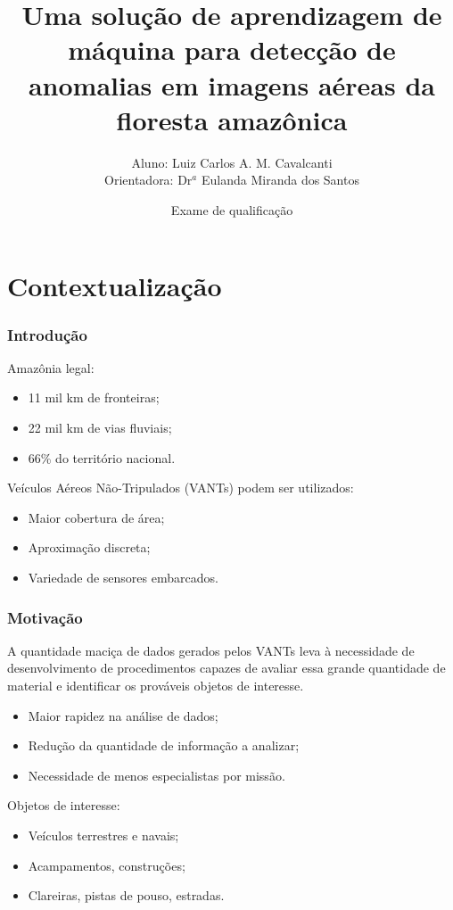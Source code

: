\documentclass[t]{beamer}
\title %
{Uma solução de aprendizagem de máquina para detecção de anomalias em imagens aéreas da floresta amazônica}
\author %
{Aluno: Luiz Carlos A. M. Cavalcanti
\\Orientadora: Dr$^a$ Eulanda Miranda dos Santos} %
\date[] %
{Exame de qualificação}
\begin{document}
  \begin{frame}\titlepage\end{frame}


\section{Contextualização}

\begin{frame}
\frametitle{Introdução}

	Amazônia legal:
	\begin{itemize}
		\item 11 mil km de fronteiras;
		\item 22 mil km de vias fluviais;
		\item 66\% do território nacional.
	\end{itemize}

	\vspace{0.5cm}

	Veículos Aéreos Não-Tripulados (VANTs) podem ser utilizados:
	\begin{itemize}
		\item Maior cobertura de área;
		\item Aproximação discreta;
		\item Variedade de sensores embarcados.
	\end{itemize}

\end{frame}

\begin{frame}
\frametitle{Motivação}

A quantidade maciça de dados gerados pelos VANTs leva à necessidade de desenvolvimento de procedimentos capazes de avaliar essa grande quantidade de material e identificar os prováveis objetos de interesse.

\begin{itemize}
	\item Maior rapidez na análise de dados;
	\item Redução da quantidade de informação a analizar;
	\item Necessidade de menos especialistas por missão.
\end{itemize}

Objetos de interesse:
\begin{itemize}
	\item Veículos terrestres e navais;
	\item Acampamentos, construções;
	\item Clareiras, pistas de pouso, estradas.
\end{itemize}



\end{frame}
\end{document}
